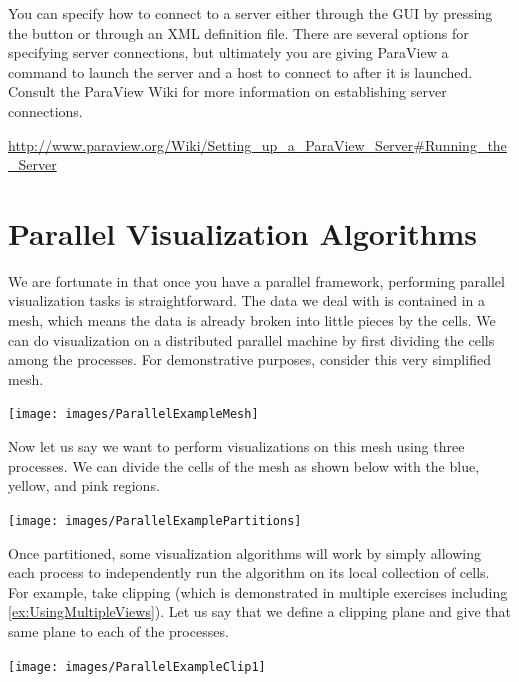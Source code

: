 You can specify how to connect to a server either through the GUI by
pressing the  button or through an XML definition file.
There are several options for specifying server connections, but ultimately
you are giving ParaView a command to launch the server and a host to
connect to after it is launched.  Consult the ParaView Wiki for more
information on establishing server connections.

{
  \footnotesize
  \href{http://www.paraview.org/Wiki/Setting_up_a_ParaView_Server#Running_the_Server}{http://www.paraview.org/Wiki/Setting\_up\_a\_ParaView\_Server\#Running\_the\_Server}
}


\section{Parallel Visualization Algorithms}

We are fortunate in that once you have a parallel framework, performing
parallel visualization tasks is straightforward.  The data we deal with is
contained in a mesh, which means the data is already broken into little
pieces by the cells.  We can do visualization on a distributed parallel
machine by first dividing the cells among the processes.  For
demonstrative purposes, consider this very simplified mesh.

\begin{inlinefig}
  \texttt{[image: images/ParallelExampleMesh]}
\end{inlinefig}

Now let us say we want to perform visualizations on this mesh using three
processes.  We can divide the cells of the mesh as shown below with the
blue, yellow, and pink regions.

\begin{inlinefig}
  \texttt{[image: images/ParallelExamplePartitions]}
\end{inlinefig}

Once partitioned, some visualization algorithms will work by simply
allowing each process to independently run the algorithm on its local
collection of cells.  For example, take clipping (which is demonstrated in
multiple exercises including \ref{ex:UsingMultipleViews}).  Let us say that
we define a clipping plane and give that same plane to each of the
processes.

\begin{inlinefig}
  \texttt{[image: images/ParallelExampleClip1]}
\end{inlinefig}

